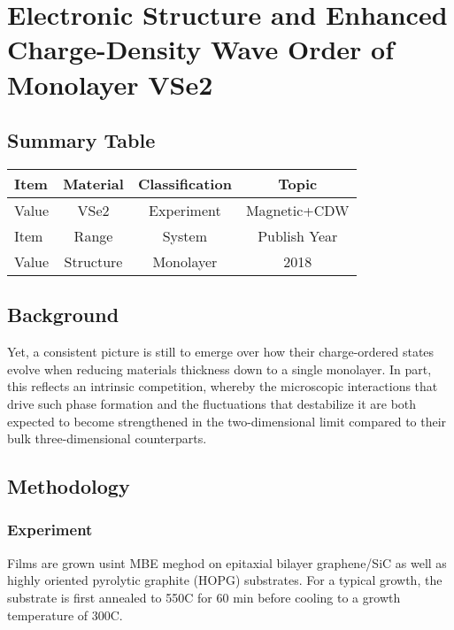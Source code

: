 \setchapterpreamble[u]{\margintoc}
\chapter{Electronic Structure and Enhanced Charge-Density Wave Order of Monolayer VSe2\cite{doi:10.1021/acs.nanolett.8b01649}}

\section{Summary Table}

\begin{table}[h]
    \begin{tabular}{lccc}
    \hline
    Item  & Material         & Classification & Topic        \\  \hline
    Value & VSe2             & Experiment     & Magnetic+CDW \\  \hline
    Item  & Range            & System         & Publish Year \\  \hline
    Value & Structure        & Monolayer      & 2018         \\  \hline
    \end{tabular}
\end{table}

\section{Background}
Yet, a consistent picture is still to emerge over how their charge-ordered states evolve when reducing materials thickness down to a single monolayer. In part, this reflects an intrinsic competition, whereby the microscopic interactions that drive such phase formation and the fluctuations that destabilize it are both expected to become strengthened in the two-dimensional limit compared to their bulk three-dimensional counterparts.

\section{Methodology}

\subsection{Experiment}
Films are grown usint MBE meghod on epitaxial bilayer graphene/SiC as well as highly oriented pyrolytic graphite (HOPG) substrates. For a typical growth, the substrate is first annealed to 550C for 60 min before cooling to a growth temperature of 300C.

